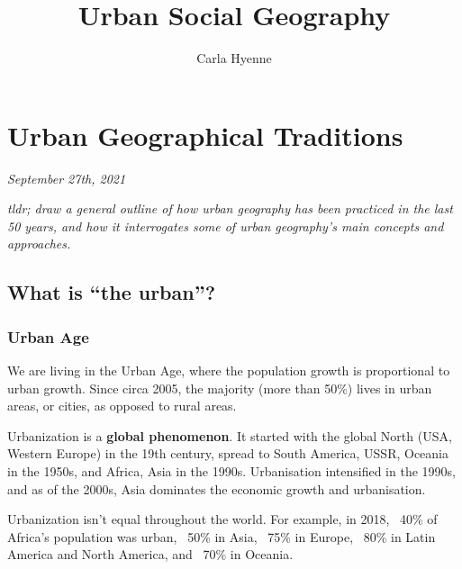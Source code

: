 \documentclass{article}
\title{Urban Social Geography}
\author{Carla Hyenne }
\begin{document}
\maketitle

\tableofcontents


\pagebreak\section{Urban Geographical Traditions}
\textit{September 27th, 2021}

\textit{tldr; draw a general outline of how urban geography has been practiced in the last 50 years, and how it interrogates some of urban geography's main concepts and approaches.}

\subsection{What is ``the urban''?}

\subsubsection{Urban Age}

We are living in the Urban Age, where the population growth is proportional to urban growth. Since circa 2005, the majority (more than 50\%) lives in urban areas, or cities, as opposed to rural areas.

Urbanization is a \textbf{global phenomenon}. It started with the global North (USA, Western Europe) in the 19th century, spread to South America, USSR, Oceania in the 1950s, and Africa, Asia in the 1990s. Urbanisation intensified in the 1990s, and as of the 2000s, Asia dominates the economic growth and urbanisation.

Urbanization isn't equal throughout the world. For example, in 2018, ~40\% of Africa's population was urban, ~50\% in Asia, ~75\% in Europe, ~80\% in Latin America and North America, and ~70\% in Oceania.
\end{document}
